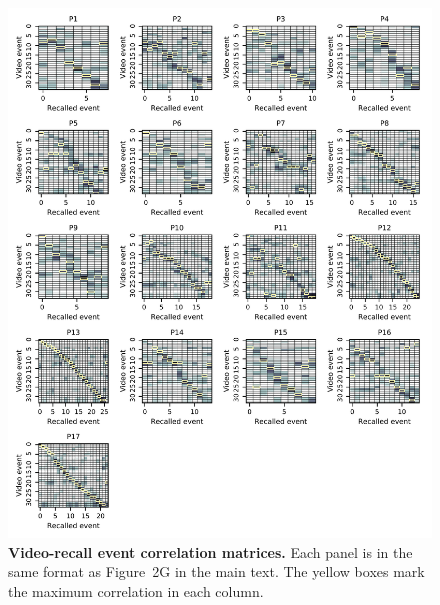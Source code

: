 \documentclass{article}
\begin{document}
\begin{figure}[htp]
\centering
\includegraphics[width=\textwidth]{figs/matchmats}
\caption{\small \textbf{Video-recall event correlation matrices.}  Each panel is in the same format as Figure~2G in the main text.  The yellow boxes mark the maximum correlation in each column.}
\label{fig:matchmats}
\end{figure}


\newpage
\renewcommand{\refname}{Supplemental references}

\end{document}
